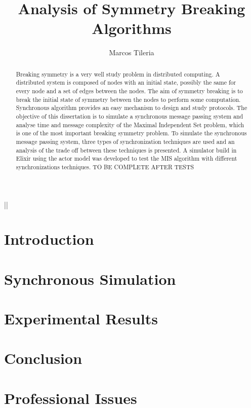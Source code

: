 ||\documentclass[11pt]{article} %
\title{Analysis of Symmetry Breaking Algorithms}
\author{Marcos Tileria}
\theoremstyle{plain}
\theoremstyle{definition}
\begin{document}
\maketitle

\declaration

\begin{abstract}
  
Breaking symmetry is a very well study problem in distributed computing. A distributed system is composed of nodes with an initial state, possibly the same for every node and a set of edges between the nodes. The aim of symmetry breaking is to break the initial state of symmetry between the nodes to perform some computation. Synchronous algorithm provides an easy mechanism to design and study protocols. The objective of this dissertation is to simulate a synchronous message passing system and analyse time and message complexity of the Maximal Independent Set problem, which is one of the most important breaking symmetry problem. To simulate the synchronous message passing system, three types of synchronization techniques are used and an analysis of the trade off between these techniques is presented. A simulator build in Elixir using the actor model was developed to test the MIS algorithm with different synchronizations techniques. TO BE COMPLETE AFTER TESTS 
  
\end{abstract}

\section{Introduction}








\section{Synchronous Simulation}

\section{Experimental Results}

\section{Conclusion}

\section{Professional Issues}




\end{document}
